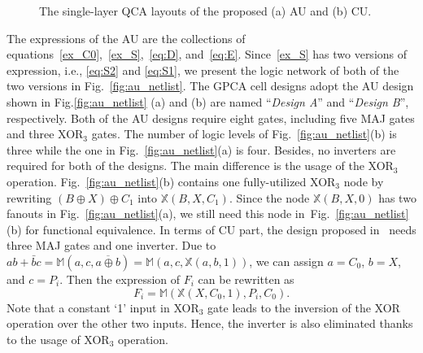 \documentclass[9pt,journal,compsoc]{IEEEtran}
\begin{document}
 \begin{figure}[b]\vspace{-1ex}
     \centering
     \vspace{-1ex}
     \caption{The single-layer QCA layouts of the proposed (a) AU and (b) CU.}\label{fig:cu_au}
 \end{figure}

The expressions of the AU are the collections of equations~\eqref{ex_C0},~\eqref{ex_S},~\eqref{eq:D}, and~\eqref{eq:E}.
Since~\eqref{ex_S} has two versions of expression, i.e., \eqref{eq:S2} and \eqref{eq:S1}, we present the logic network of both of the two versions in Fig.~\ref{fig:au_netlist}. 
The GPCA cell designs adopt the AU design shown in Fig.\ref{fig:au_netlist} (a) and (b) are named ``\emph{Design A}'' and ``\emph{Design B}'', respectively. 
Both of the AU designs require eight gates, including five MAJ gates and three XOR$_3$ gates. The number of logic levels of Fig.~\ref{fig:au_netlist}(b) is three while the one in Fig.~\ref{fig:au_netlist}(a) is four.
Besides, no inverters are required for both of the designs.
The main difference is the usage of the XOR$_3$ operation. Fig.~\ref{fig:au_netlist}(b) contains one fully-utilized XOR$_3$ node by rewriting $(B \oplus X) \oplus C_1$
into $\mathbb{X}(B, X, C_1)$. Since the node $\mathbb{X}(B, X, 0)$ has two fanouts in Fig.~\ref{fig:au_netlist}(a), we still need this node in~Fig.~\ref{fig:au_netlist}(b) for functional equivalence.
In terms of CU part, the design proposed in~\cite{2} needs three MAJ gates and one inverter. Due to $ab + \bar b c = \mathbb{M}(a, c, \overline{a \oplus b}) = \mathbb{M}(a, c, \mathbb{X}(a,b,1))$, we can assign $a = C_0$, $b = X$, and $c = P_i$. Then the expression of $F_i$ can be rewritten as
\begin{equation}\label{Fi_xmg}
F_{i} = \mathbb{M}(\mathbb{X}(X,C_{0},1),P_{i},C_{0}).
\end{equation}
Note that a constant `1' input in XOR$_3$ gate leads to the inversion of the XOR operation over the other two inputs. Hence, the inverter is also eliminated thanks to the usage of XOR$_3$ operation.
\end{document}
